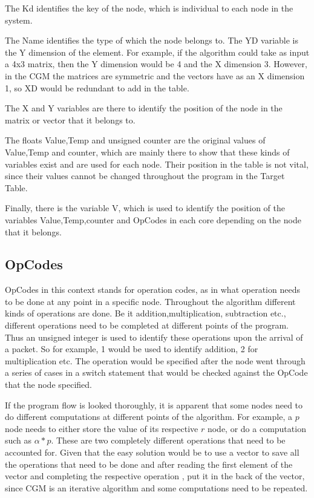 \documentclass[12pt,a4paper]{article}
\begin{document}
The Kd identifies the key of the node, which is individual to each node in the system. 

The Name identifies the type of which the node belongs to. The YD variable is the Y dimension of the element. For example, if the algorithm could take as input a 4x3 matrix, then the Y dimension would be 4 and the X dimension 3. However, in the CGM the matrices are symmetric and the vectors have as an X dimension 1, so XD would be redundant to add in the table. 

The X and Y variables are there to identify the position of the node in the matrix or vector that it belongs to. 

The floats Value,Temp and unsigned counter are the original values of Value,Temp and counter, which are mainly there to show that these kinds of variables exist and are used for each node. Their position in the table is not vital, since their values cannot be changed throughout the program in the Target Table. 

Finally, there is the variable V, which is used to identify the position of the variables Value,Temp,counter and OpCodes in each core depending on the node that it belongs.
\subsection{OpCodes}
OpCodes in this context stands for operation codes, as in what operation needs to be done at any point in a specific node. Throughout the algorithm different kinds of operations are done. Be it addition,multiplication, subtraction etc., different operations need to be completed at different points of the program. Thus an unsigned integer is used to identify these operations upon the arrival of a packet. So for example, 1 would be used to identify addition, 2 for multiplication etc. The operation would be specified after the node went through a series of cases in a switch statement that would be checked against the OpCode that the node specified.

If the program flow is looked thoroughly, it is apparent that some nodes need to do different computations at different points of the algorithm. For example, a $p$ node needs to either store the value of its respective $r$ node, or do a computation such as $\alpha *p$. These are two completely different operations that need to be accounted for. Given that the easy solution would be to use a vector to save all the operations that need to be done and after reading the first element of the vector and completing the respective operation , put it in the back of the vector, since CGM is an iterative algorithm and some computations need to be repeated.
\end{document}

